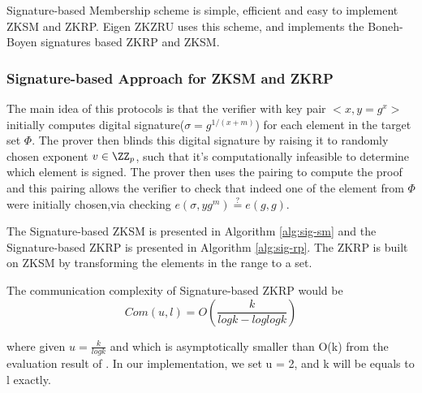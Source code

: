 
Signature-based\cite{camenisch2008efficient} Membership scheme is simple, efficient and easy to implement ZKSM and ZKRP.  Eigen ZKZRU uses this scheme, and implements the Boneh-Boyen signatures \cite{jao2009boneh} based ZKRP and ZKSM.


\subsubsection{Signature-based Approach for ZKSM and ZKRP}

The main idea of this protocols is that the verifier with key pair $<x, y = g^x>$ initially computes digital signature($\sigma = g^{1/(x+m)}$) for each element in the target set $\Phi$. The prover then blinds this digital signature by raising it to randomly chosen exponent $v \in \ZZ_p$, such that it's computationally infeasible to determine which element is signed. The prover then uses the pairing to compute the proof and this pairing allows the verifier to check that indeed one of the element from $\Phi$ were initially chosen,via checking $e(\sigma, yg^m) \overset{?}{=} e(g, g)$.

The Signature-based ZKSM is presented in Algorithm \ref{alg:sig-sm} and the Signature-based ZKRP is presented in Algorithm \ref{alg:sig-rp}. The ZKRP is built on ZKSM by transforming the elements in the range to a set.

The communication complexity of Signature-based ZKRP would be 
\begin{equation}
    Com(u, l) = O(\frac{k}{logk - loglogk})
\end{equation}

where given $u = \frac{k}{logk}$ 
and which is asymptotically smaller than O(k) from the evaluation result of \cite{camenisch2008efficient}. In our implementation, we set u = 2, and k will be equals to l exactly.


